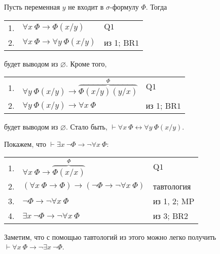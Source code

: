 \documentclass[12pt,a4paper]{article}
\begin{document}
    \begin{example}
        Пусть переменная $y$ не входит в $\sigma$-формулу $\Phi$. Тогда
        \begin{center}
            \begin{tabular}{rll}
                1.& $\forall x\ \Phi \rightarrow \Phi(x/y)$& $\mathrm{Q1}$\\
                2.& $\forall x\ \Phi \rightarrow \forall y\ \Phi(x/y)$& из 1; $\mathrm{BR1}$
            \end{tabular}
        \end{center}
        будет выводом из $\varnothing$. Кроме того,
        \begin{center}
            \begin{tabular}{rll}
                1.& $\forall y\ \Phi(x/y) \rightarrow \overbrace{\Phi(x/y)(y/x)}^\Phi$& $\mathrm{Q1}$\\
                2.& $\forall y\ \Phi(x/y) \rightarrow \forall x\ \Phi$& из 1; $\mathrm{BR1}$
            \end{tabular}
        \end{center}
        будет выводом из $\varnothing$. Стало быть, $\vdash \forall x\ \Phi \leftrightarrow \forall y\ \Phi(x/y)$.
    \end{example}

    \begin{example}
        Покажем, что $\vdash \exists x\ \neg \Phi \rightarrow \neg \forall x\ \Phi$:
        \begin{center}
            \begin{tabular}{rll}
                1.& $\forall x\ \Phi \rightarrow \overbrace{\Phi(x/x)}^\Phi$& $\mathrm{Q1}$\\
                2.& $(\forall x\ \Phi \rightarrow \Phi) \rightarrow (\neg \Phi \rightarrow \neg \forall x\ \Phi)$& тавтология\\
                3.& $\neg \Phi \rightarrow \neg \forall x\ \Phi$& из 1, 2; $\mathrm{MP}$\\
                4.& $\exists x\ \neg \Phi \rightarrow \neg \forall x\ \Phi$& из 3; $\mathrm{BR2}$
            \end{tabular}
        \end{center}
        Заметим, что с помощью тавтологий из этого можно легко получить $\vdash \forall x\ \Phi \rightarrow \neg \exists x\ \neg \Phi$.
    \end{example}
\end{document}
